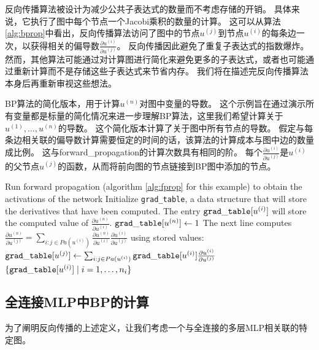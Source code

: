 
反向传播算法被设计为减少公共子表达式的数量而不考虑存储的开销。
具体来说，它执行了图中每个节点一个Jacobi乘积的数量的计算。
这可以从算法\ref{alg:bprop}中看出，反向传播算法访问了图中的节点$u^{(j)}$到节点$u^{(i)}$的每条边一次，以获得相关的偏导数$\frac{\partial u^{(i)}}{\partial u^{(j)}}$。
反向传播因此避免了重复子表达式的指数爆炸。
然而，其他算法可能通过对计算图进行简化来避免更多的子表达式，或者也可能通过重新计算而不是存储这些子表达式来节省内存。
我们将在描述完反向传播算法本身后再重新审视这些想法。
\begin{algorithm}[htb!]
\caption{\gls{BP}算法的简化版本，用于计算$u^{(n)}$对图中变量的导数。
这个示例旨在通过演示所有变量都是标量的简化情况来进一步理解\gls{BP}算法，这里我们希望计算关于$u^{(1)},\ldots,u^{(n)}$的导数。
这个简化版本计算了关于图中所有节点的导数。
假定与每条边相关联的偏导数计算需要恒定的时间的话，该算法的计算成本与图中边的数量成比例。
这与\gls{forward_propagation}的计算次数具有相同的阶。
每个$\frac{\partial u^{(i)}}{\partial u^{(j)}}$是$u^{(i)}$的父节点$u^{(j)}$的函数，从而将前向图的节点链接到\gls{BP}图中添加的节点。}
\label{alg:bprop}
\begin{algorithmic}
\STATE Run forward propagation (algorithm \ref{alg:fprop} for this example) to obtain
the activations of the network
\STATE Initialize {\tt grad\_table}, a data structure that will store the derivatives
that have been computed. The entry ${\tt grad\_table}[u^{(i)}]$ will store the computed
value of $\frac{\partial u^{(n)}}{\partial u^{(i)}}$.
\STATE ${\tt grad\_table}[u^{(n)}] \leftarrow 1$
\STATE The next line computes $\frac{\partial u^{(n)}}{\partial u^{(j)}} =
  \sum_{i: j \in Pa(u^{(i)})} \frac{\partial u^{(n)}}{\partial u^{(i)}} \frac{\partial u^{(i)}}{\partial u^{(j)}}$ using stored values:
\STATE ${\tt grad\_table}[ u^{(j)}] \leftarrow 
\sum_{i: j \in Pa(u^{(i)})} {\tt grad\_table}[u^{(i)}]
\frac{\partial u^{(i)}}{\partial u^{(j)}}$
\ENDFOR
{} $\{ {\tt grad\_table}[ u^{(i)}] \mid i=1, \dots, n_i \} $
\end{algorithmic}
\end{algorithm}



\subsection{全连接MLP中BP的计算}
\label{sec:back_propagation_computation_in_fully_connected_mlp}

为了阐明反向传播的上述定义，让我们考虑一个与全连接的多层MLP相关联的特定图。

